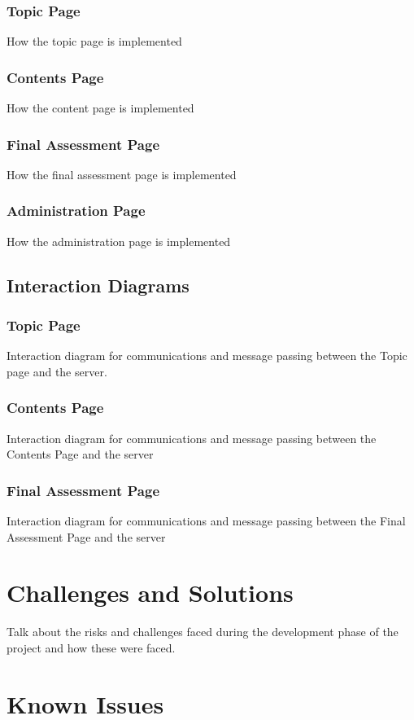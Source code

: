 \documentclass{l3proj}
\begin{document}
\subsubsection{Topic Page}
How the topic page is implemented
\subsubsection{Contents Page}
How the content page is implemented
\subsubsection{Final Assessment Page}
How the final assessment page is implemented
\subsubsection{Administration Page}
How the administration page is implemented
\subsection{Interaction Diagrams}
\subsubsection{Topic Page}
Interaction diagram for communications and message passing between the Topic page and the server.
\subsubsection{Contents Page}
Interaction diagram for communications and message passing between the Contents Page and the server
\subsubsection{Final Assessment Page}
Interaction diagram for communications and message passing between the Final Assessment Page and the server
\section{Challenges and Solutions}
Talk about the risks and challenges faced during the development phase of the project and how these were faced.
\section{Known Issues}
\end{document}
